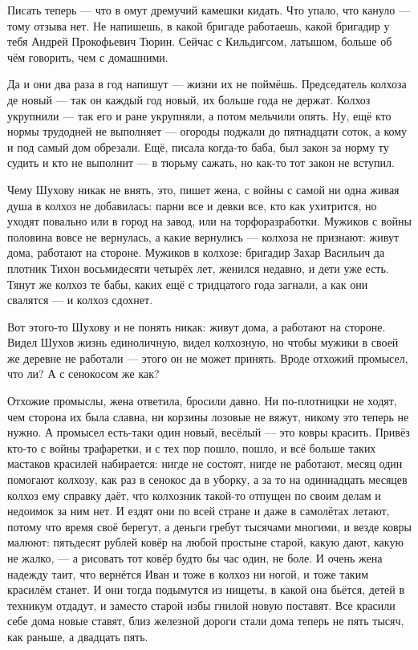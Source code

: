 Писать теперь --- что в омут дремучий камешки кидать. Что упало, что кануло --- тому отзыва нет.
Не напишешь, в какой бригаде работаешь, какой бригадир у тебя Андрей Прокофьевич Тюрин.
Сейчас с Кильдигсом, латышом, больше об чём говорить, чем с домашними.

Да и они два раза в год напишут --- жизни их не поймёшь. Председатель колхоза де новый --- так он
каждый год новый, их больше года не держат. Колхоз укрупнили --- так его и ране укрупняли, а
потом мельчили опять. Ну, ещё кто нормы трудодней не выполняет --- огороды поджали до
пятнадцати соток, а кому и под самый дом обрезали. Ещё, писала когда-то баба, был закон за
норму ту судить и кто не выполнит --- в тюрьму сажать, но как-то тот закон не вступил.

Чему Шухову никак не внять, это, пишет жена, с войны с самой ни одна живая душа в колхоз не
добавилась: парни все и девки все, кто как ухитрится, но уходят повально или в город на завод,
или на торфоразработки. Мужиков с войны половина вовсе не вернулась, а какие вернулись ---
колхоза не признают: живут дома, работают на стороне. Мужиков в колхозе: бригадир Захар
Васильич да плотник Тихон восьмидесяти четырёх лет, женился недавно, и дети уже есть. Тянут
же колхоз те бабы, каких ещё с тридцатого года загнали, а как они свалятся --- и колхоз сдохнет.

Вот этого-то Шухову и не понять никак: живут дома, а работают на стороне. Видел Шухов жизнь
единоличную, видел колхозную, но чтобы мужики в своей же деревне не работали --- этого он не
может принять. Вроде отхожий промысел, что ли? А с сенокосом же как?

Отхожие промыслы, жена ответила, бросили давно. Ни по-плотницки не ходят, чем сторона их была
славна, ни корзины лозовые не вяжут, никому это теперь не нужно. А промысел есть-таки один
новый, весёлый --- это ковры красить. Привёз кто-то с войны трафаретки, и с тех пор пошло, пошло,
и всё больше таких мастаков красилей набирается: нигде не состоят, нигде не работают, месяц
один помогают колхозу, как раз в сенокос да в уборку, а за то на одиннадцать месяцев колхоз
ему справку даёт, что колхозник такой-то отпущен по своим делам и недоимок за ним нет. И ездят
они по всей стране и даже в самолётах летают, потому что время своё берегут, а деньги гребут
тысячами многими, и везде ковры малюют: пятьдесят рублей ковёр на любой простыне старой,
какую дают, какую не жалко, --- а рисовать тот ковёр будто бы час один, не боле. И очень жена
надежду таит, что вернётся Иван и тоже в колхоз ни ногой, и тоже таким красилём станет. И они
тогда подымутся из нищеты, в какой она бьётся, детей в техникум отдадут, и заместо старой
избы гнилой новую поставят. Все красили себе дома новые ставят, близ железной дороги стали
дома теперь не пять тысяч, как раньше, а двадцать пять.


